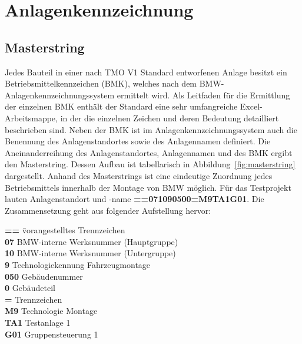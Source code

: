 


\section{Anlagenkennzeichnung}
\label{sec:naming}

\subsection*{Masterstring}
\label{subsec:masterstring}




Jedes Bauteil in einer nach TMO V1 Standard entworfenen Anlage besitzt ein Betriebsmittelkennzeichen (BMK), welches nach dem BMW-Anlagenkennzeichnungssystem ermittelt wird. Als Leitfaden für die Ermittlung der einzelnen BMK enthält der Standard eine sehr umfangreiche Excel-Arbeitsmappe, in der die einzelnen Zeichen und deren Bedeutung detailliert beschrieben sind.
Neben der BMK ist im Anlagenkennzeichnungssystem auch die Benennung des Anlagenstandortes sowie des Anlagennamen definiert. Die Aneinanderreihung des Anlagenstandortes, Anlagennamen und des BMK ergibt den Masterstring. Dessen Aufbau ist tabellarisch in Abbildung~\ref{fig:masterstring} dargestellt. Anhand des Masterstrings ist eine eindeutige Zuordnung jedes Betriebsmittels innerhalb der Montage von BMW möglich.
Für das Testprojekt lauten Anlagenstandort und -name \textbf{==071090500=M9TA1G01}. Die Zusammensetzung geht aus folgender Aufstellung hervor:

\begin{tabbing}
  \textbf{==\hspace{0.5cm}} \= vorangestelltes Trennzeichen \\
  \textbf{07} \> BMW-interne Werksnummer (Hauptgruppe) \\
  \textbf{10} \> BMW-interne Werksnummer (Untergruppe) \\
  \textbf{9} \> Technologiekennung Fahrzeugmontage \\
  \textbf{050} \> Gebäudenummer \\
  \textbf{0} \> Gebäudeteil \\
  \textbf{=} \> Trennzeichen \\
  \textbf{M9} \> Technologie Montage \\
  \textbf{TA1} \> Testanlage 1 \\
  \textbf{G01} \> Gruppensteuerung 1
\end{tabbing}

